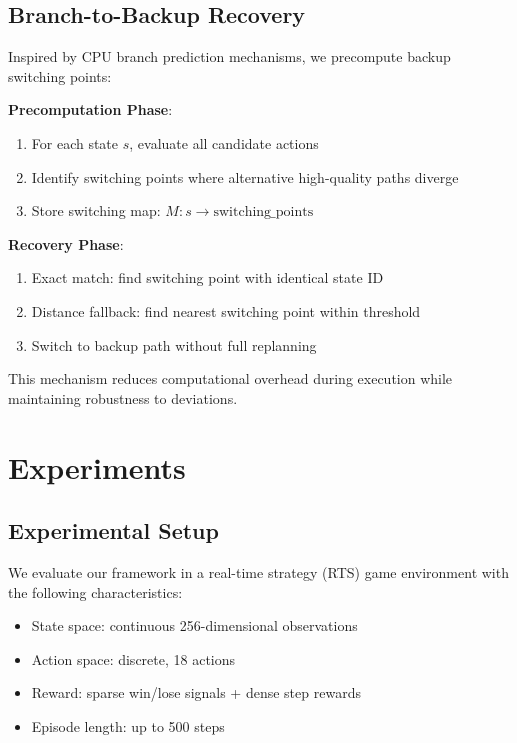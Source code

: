 \documentclass[letterpaper]{article}
\begin{document}
\subsection{Branch-to-Backup Recovery}

Inspired by CPU branch prediction mechanisms, we precompute backup switching points:

\textbf{Precomputation Phase}:
\begin{enumerate}
    \item For each state $s$, evaluate all candidate actions
    \item Identify switching points where alternative high-quality paths diverge
    \item Store switching map: $M: s \rightarrow \text{switching\_points}$
\end{enumerate}

\textbf{Recovery Phase}:
\begin{enumerate}
    \item Exact match: find switching point with identical state ID
    \item Distance fallback: find nearest switching point within threshold
    \item Switch to backup path without full replanning
\end{enumerate}

This mechanism reduces computational overhead during execution while maintaining robustness to deviations.

\section{Experiments}

\subsection{Experimental Setup}

We evaluate our framework in a real-time strategy (RTS) game environment with the following characteristics:

\begin{itemize}
    \item State space: continuous 256-dimensional observations
    \item Action space: discrete, 18 actions
    \item Reward: sparse win/lose signals + dense step rewards
    \item Episode length: up to 500 steps
\end{itemize}
\end{document}
